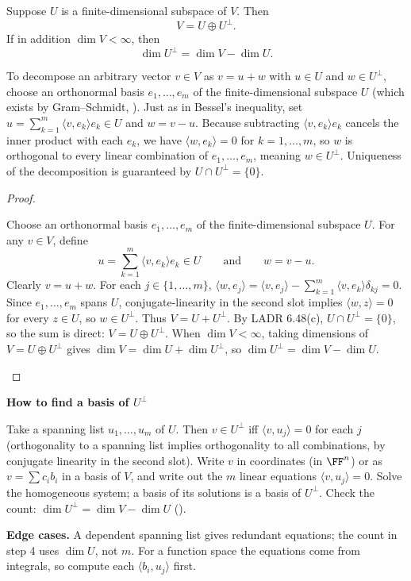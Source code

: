 \documentclass[10pt]{scrartcl}
\newcommand{\ip}[2]{\langle #1,#2\rangle}
\newenvironment{methodbox}[1]{\begin{mdframed}[style=mdbluebox,linecolor=NavyBlue,backgroundcolor=NavyBlue!3]\textbf{\color{NavyBlue}#1}\par\vspace{2pt}}{\end{mdframed}}
\begin{document}
\begin{theorem*}[Prop.~89 / LADR 6.49, 6.50: Direct sum $V=U\oplus U^\perp$ and $\dim U^\perp$]
  Suppose $U$ is a finite-dimensional subspace of $V$. Then
  \[
    V = U \oplus U^\perp.
  \]
  If in addition $\dim V<\infty$, then
  \[
    \dim U^\perp = \dim V - \dim U.
  \]
\end{theorem*}
\begin{ideabox}
  To decompose an arbitrary vector $v\in V$ as $v=u+w$ with $u\in U$ and $w\in U^\perp$, choose an orthonormal basis $e_1,\dots,e_m$ of the finite-dimensional subspace $U$ (which exists by Gram--Schmidt, ). Just as in Bessel's inequality, set $u=\sum_{k=1}^m\ip v{e_k}e_k\in U$ and $w=v-u$. Because subtracting $\ip v{e_k}e_k$ cancels the inner product with each $e_k$, we have $\ip w{e_k}=0$ for $k=1,\dots,m$, so $w$ is orthogonal to every linear combination of $e_1,\dots,e_m$, meaning $w\in U^\perp$. Uniqueness of the decomposition is guaranteed by $U\cap U^\perp=\{0\}$.
\end{ideabox}
\begin{proof}
  \begin{steps}
    \ii Choose an orthonormal basis $e_1,\dots,e_m$ of the finite-dimensional subspace $U$. For any $v\in V$, define
    \[
      u = \sum_{k=1}^m \ip v{e_k}e_k \in U \qquad\text{and}\qquad w = v - u.
    \]
    \ii Clearly $v=u+w$. For each $j\in\{1,\dots,m\}$, $\ip w{e_j}=\ip v{e_j}-\sum_{k=1}^m\ip v{e_k}\delta_{kj}=0$. Since $e_1,\dots,e_m$ spans $U$, conjugate-linearity in the second slot implies $\ip wz=0$ for every $z\in U$, so $w\in U^\perp$. Thus $V=U+U^\perp$.
    \ii By LADR 6.48(c), $U\cap U^\perp=\{0\}$, so the sum is direct: $V=U\oplus U^\perp$.
    \ii When $\dim V<\infty$, taking dimensions of $V=U\oplus U^\perp$ gives $\dim V=\dim U+\dim U^\perp$, so $\dim U^\perp=\dim V-\dim U$.
  \end{steps}
\end{proof}

\begin{methodbox}{How to find a basis of $U^\perp$}
\begin{enumerate}[label=\arabic*.,leftmargin=1.5em,itemsep=2pt,topsep=2pt]
  \ii Take a spanning list $u_1,\dots,u_m$ of $U$. Then $v\in U^\perp$ iff $\ip v{u_j}=0$ for each $j$ (orthogonality to a spanning list implies orthogonality to all combinations, by conjugate linearity in the second slot).
  \ii Write $v$ in coordinates (in $\FF^n$) or as $v=\sum c_ib_i$ in a basis of $V$, and write out the $m$ linear equations $\ip v{u_j}=0$.
  \ii Solve the homogeneous system; a basis of its solutions is a basis of $U^\perp$.
  \ii Check the count: $\dim U^\perp=\dim V-\dim U$ ().
\end{enumerate}
\textbf{Edge cases.} A dependent spanning list gives redundant equations; the count in step 4 uses $\dim U$, not $m$. For a function space the equations come from integrals, so compute each $\ip{b_i}{u_j}$ first.
\end{methodbox}
\end{document}
